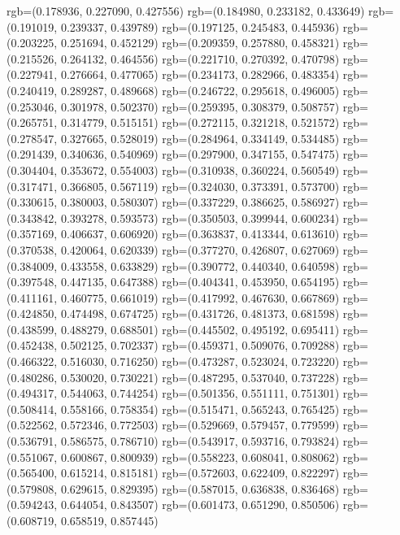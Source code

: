 {{{					rgb=(0.178936, 0.227090, 0.427556)
					rgb=(0.184980, 0.233182, 0.433649)
					rgb=(0.191019, 0.239337, 0.439789)
					rgb=(0.197125, 0.245483, 0.445936)
					rgb=(0.203225, 0.251694, 0.452129)
					rgb=(0.209359, 0.257880, 0.458321)
					rgb=(0.215526, 0.264132, 0.464556)
					rgb=(0.221710, 0.270392, 0.470798)
					rgb=(0.227941, 0.276664, 0.477065)
					rgb=(0.234173, 0.282966, 0.483354)
					rgb=(0.240419, 0.289287, 0.489668)
					rgb=(0.246722, 0.295618, 0.496005)
					rgb=(0.253046, 0.301978, 0.502370)
					rgb=(0.259395, 0.308379, 0.508757)
					rgb=(0.265751, 0.314779, 0.515151)
					rgb=(0.272115, 0.321218, 0.521572)
					rgb=(0.278547, 0.327665, 0.528019)
					rgb=(0.284964, 0.334149, 0.534485)
					rgb=(0.291439, 0.340636, 0.540969)
					rgb=(0.297900, 0.347155, 0.547475)
					rgb=(0.304404, 0.353672, 0.554003)
					rgb=(0.310938, 0.360224, 0.560549)
					rgb=(0.317471, 0.366805, 0.567119)
					rgb=(0.324030, 0.373391, 0.573700)
					rgb=(0.330615, 0.380003, 0.580307)
					rgb=(0.337229, 0.386625, 0.586927)
					rgb=(0.343842, 0.393278, 0.593573)
					rgb=(0.350503, 0.399944, 0.600234)
					rgb=(0.357169, 0.406637, 0.606920)
					rgb=(0.363837, 0.413344, 0.613610)
					rgb=(0.370538, 0.420064, 0.620339)
					rgb=(0.377270, 0.426807, 0.627069)
					rgb=(0.384009, 0.433558, 0.633829)
					rgb=(0.390772, 0.440340, 0.640598)
					rgb=(0.397548, 0.447135, 0.647388)
					rgb=(0.404341, 0.453950, 0.654195)
					rgb=(0.411161, 0.460775, 0.661019)
					rgb=(0.417992, 0.467630, 0.667869)
					rgb=(0.424850, 0.474498, 0.674725)
					rgb=(0.431726, 0.481373, 0.681598)
					rgb=(0.438599, 0.488279, 0.688501)
					rgb=(0.445502, 0.495192, 0.695411)
					rgb=(0.452438, 0.502125, 0.702337)
					rgb=(0.459371, 0.509076, 0.709288)
					rgb=(0.466322, 0.516030, 0.716250)
					rgb=(0.473287, 0.523024, 0.723220)
					rgb=(0.480286, 0.530020, 0.730221)
					rgb=(0.487295, 0.537040, 0.737228)
					rgb=(0.494317, 0.544063, 0.744254)
					rgb=(0.501356, 0.551111, 0.751301)
					rgb=(0.508414, 0.558166, 0.758354)
					rgb=(0.515471, 0.565243, 0.765425)
					rgb=(0.522562, 0.572346, 0.772503)
					rgb=(0.529669, 0.579457, 0.779599)
					rgb=(0.536791, 0.586575, 0.786710)
					rgb=(0.543917, 0.593716, 0.793824)
					rgb=(0.551067, 0.600867, 0.800939)
					rgb=(0.558223, 0.608041, 0.808062)
					rgb=(0.565400, 0.615214, 0.815181)
					rgb=(0.572603, 0.622409, 0.822297)
					rgb=(0.579808, 0.629615, 0.829395)
					rgb=(0.587015, 0.636838, 0.836468)
					rgb=(0.594243, 0.644054, 0.843507)
					rgb=(0.601473, 0.651290, 0.850506)
					rgb=(0.608719, 0.658519, 0.857445)
}}}
